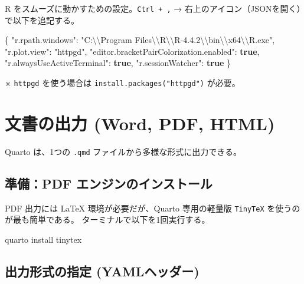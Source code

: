\documentclass[
  pandoc]{bxjsarticle}
\newenvironment{Shaded}{\begin{snugshade}}{\end{snugshade}}
\newcommand{\CharTok}[1]{\textcolor[rgb]{0.13,0.47,0.30}{#1}}
\newcommand{\DataTypeTok}[1]{\textcolor[rgb]{0.68,0.00,0.00}{#1}}
\newcommand{\ExtensionTok}[1]{\textcolor[rgb]{0.00,0.23,0.31}{#1}}
\newcommand{\FunctionTok}[1]{\textcolor[rgb]{0.28,0.35,0.67}{#1}}
\newcommand{\KeywordTok}[1]{\textcolor[rgb]{0.00,0.23,0.31}{\textbf{#1}}}
\newcommand{\NormalTok}[1]{\textcolor[rgb]{0.00,0.23,0.31}{#1}}
\newcommand{\StringTok}[1]{\textcolor[rgb]{0.13,0.47,0.30}{#1}}
\begin{document}
R をスムーズに動かすための設定。\texttt{Ctrl\ +\ ,} →
右上のアイコン（JSONを開く）で以下を追記する。

\begin{Shaded}
\begin{Highlighting}[]
\FunctionTok{\{}
    \DataTypeTok{"r.rpath.windows"}\FunctionTok{:} \StringTok{"C:}\CharTok{\textbackslash{}\textbackslash{}}\StringTok{Program Files}\CharTok{\textbackslash{}\textbackslash{}}\StringTok{R}\CharTok{\textbackslash{}\textbackslash{}}\StringTok{R{-}4.4.2}\CharTok{\textbackslash{}\textbackslash{}}\StringTok{bin}\CharTok{\textbackslash{}\textbackslash{}}\StringTok{x64}\CharTok{\textbackslash{}\textbackslash{}}\StringTok{R.exe"}\FunctionTok{,}
    \DataTypeTok{"r.plot.view"}\FunctionTok{:} \StringTok{"httpgd"}\FunctionTok{,}
    \DataTypeTok{"editor.bracketPairColorization.enabled"}\FunctionTok{:} \KeywordTok{true}\FunctionTok{,}
    \DataTypeTok{"r.alwaysUseActiveTerminal"}\FunctionTok{:} \KeywordTok{true}\FunctionTok{,}
    \DataTypeTok{"r.sessionWatcher"}\FunctionTok{:} \KeywordTok{true}
\FunctionTok{\}}
\end{Highlighting}
\end{Shaded}

※ \texttt{httpgd} を使う場合は \texttt{install.packages("httpgd")}
が必要。

\section{文書の出力 (Word, PDF,
HTML)}\label{ux6587ux66f8ux306eux51faux529b-word-pdf-html}

Quarto は、1つの \texttt{.qmd} ファイルから多様な形式に出力できる。

\subsection{準備：PDF
エンジンのインストール}\label{ux6e96ux5099pdf-ux30a8ux30f3ux30b8ux30f3ux306eux30a4ux30f3ux30b9ux30c8ux30fcux30eb}

PDF 出力には LaTeX 環境が必要だが、Quarto 専用の軽量版 \texttt{TinyTeX}
を使うのが最も簡単である。 ターミナルで以下を1回実行する。

\begin{Shaded}
\begin{Highlighting}[]
\ExtensionTok{quarto}\NormalTok{ install tinytex}
\end{Highlighting}
\end{Shaded}

\subsection{出力形式の指定
(YAMLヘッダー)}\label{ux51faux529bux5f62ux5f0fux306eux6307ux5b9a-yamlux30d8ux30c3ux30c0ux30fc}
\end{document}
